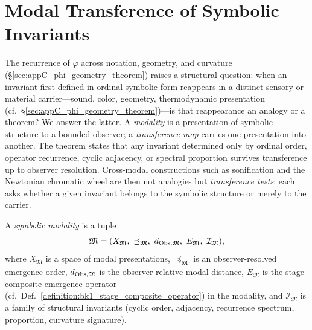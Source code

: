 \section{Modal Transference of Symbolic Invariants}
\label{sec:appC_modal_transference}
The recurrence of $\varphi$ across notation, geometry, and curvature
(\S\ref{sec:appC_phi_geometry_theorem}) raises a structural question: when an
invariant first defined in ordinal-symbolic form reappears in a distinct
sensory or material carrier---sound, color, geometry, thermodynamic
presentation (cf.~\S\ref{sec:appC_phi_geometry_theorem})---is that reappearance an
analogy or a theorem? We answer the
latter. A \emph{modality} is a presentation of symbolic structure to a bounded
observer; a \emph{transference map} carries one presentation into another. The
theorem states that any invariant determined only by ordinal order, operator
recurrence, cyclic adjacency, or spectral proportion survives transference up to
observer resolution. Cross-modal constructions such as sonification and the
Newtonian chromatic wheel are then not analogies but \emph{transference tests}:
each asks whether a given invariant belongs to the symbolic structure or merely
to the carrier.

\begin{definition}
\label{definition:appC_symbolic_modality}
A \emph{symbolic modality} is a tuple
\[
\mathfrak{M} = (X_\mathfrak{M},\ \preceq_\mathfrak{M},\ d_{\mathrm{Obs},\mathfrak{M}},\
E_\mathfrak{M},\ \mathcal{I}_\mathfrak{M}),
\]
where $X_\mathfrak{M}$ is a space of modal presentations, $\preceq_\mathfrak{M}$
is an observer-resolved emergence order, $d_{\mathrm{Obs},\mathfrak{M}}$ is the
observer-relative modal distance, $E_\mathfrak{M}$ is the stage-composite
emergence operator (cf.~Def.~\ref{definition:bk1_stage_composite_operator}) in
the modality, and $\mathcal{I}_\mathfrak{M}$ is a family of structural invariants
(cyclic order, adjacency, recurrence spectrum, proportion, curvature signature).
\end{definition}

